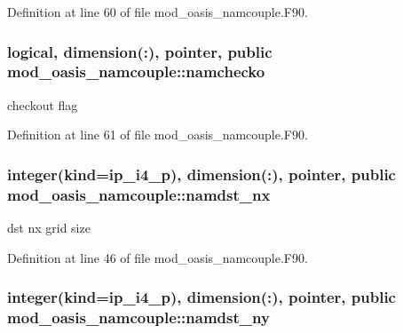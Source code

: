 Definition at line 60 of file mod\+\_\+oasis\+\_\+namcouple.\+F90.

\hypertarget{classmod__oasis__namcouple_a58c011820e55c9af9f306fbb1d45eb23}{
\subsubsection[{namchecko}]{\setlength{\rightskip}{0pt plus 5cm}logical, dimension(\+:), pointer, public mod\+\_\+oasis\+\_\+namcouple\+::namchecko}}\label{classmod__oasis__namcouple_a58c011820e55c9af9f306fbb1d45eb23}


checkout flag 



Definition at line 61 of file mod\+\_\+oasis\+\_\+namcouple.\+F90.

\hypertarget{classmod__oasis__namcouple_a6add94418eefdaefd78cd971888a5826}{
\subsubsection[{namdst\+\_\+nx}]{\setlength{\rightskip}{0pt plus 5cm}integer(kind=ip\+\_\+i4\+\_\+p), dimension(\+:), pointer, public mod\+\_\+oasis\+\_\+namcouple\+::namdst\+\_\+nx}}\label{classmod__oasis__namcouple_a6add94418eefdaefd78cd971888a5826}


dst nx grid size 



Definition at line 46 of file mod\+\_\+oasis\+\_\+namcouple.\+F90.

\hypertarget{classmod__oasis__namcouple_a9035fc89396bad9574c88642d3aac5f0}{
\subsubsection[{namdst\+\_\+ny}]{\setlength{\rightskip}{0pt plus 5cm}integer(kind=ip\+\_\+i4\+\_\+p), dimension(\+:), pointer, public mod\+\_\+oasis\+\_\+namcouple\+::namdst\+\_\+ny}}\label{classmod__oasis__namcouple_a9035fc89396bad9574c88642d3aac5f0}


